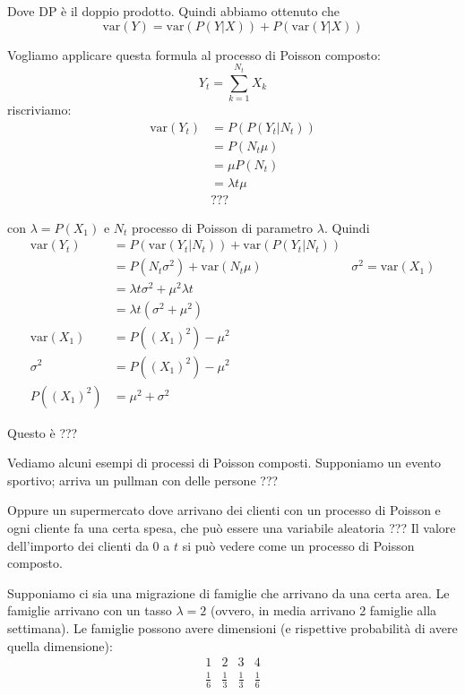 \documentclass[a4paper,12pt]{book}
\begin{document}
Dove DP è il doppio prodotto. Quindi abbiamo ottenuto che 
$$ \text{var}(Y) = \text{var}(P(Y|X)) + P(\text{var}(Y|X)) $$

Vogliamo applicare questa formula al processo di Poisson composto:
$$ Y_t = \sum_{k = 1}^{N_t} X_k $$ 
riscriviamo:
\begin{align*}
	\text{var}(Y_t) & = P(P(Y_t | N_t)) \\
	& = P(N_t \mu) \\
	& = \mu P(N_t) \\
	& = \lambda t \mu\\
	& ??? %
\end{align*}

con $\lambda = P(X_1)$ e $ N_t $ processo di Poisson di parametro $\lambda$.
Quindi 
\begin{align*}
	\text{var}(Y_t) & = P(\text{var}(Y_t | N_t)) + \text{var}(P(Y_t | N_t)) \\
	& = P(N_t \sigma^2) + \text{var}(N_t \mu) & \sigma^2 = \text{var}(X_1) \\
	& = \lambda t \sigma^2 + \mu^2 \lambda t \\ %
	& = \lambda t(\sigma^2 + \mu^2) \\
	\text{var}(X_1)	 & = P((X_1)^2) - \mu^2 \\
	\sigma^2 & = P((X_1)^2) - \mu^2 \\
	P((X_1)^2) & = \mu^2 + \sigma^2
\end{align*}

Questo è ??? %

Vediamo alcuni esempi di processi di Poisson composti. Supponiamo un evento sportivo; arriva un pullman con delle persone ??? %

Oppure un supermercato dove arrivano dei clienti con un processo di Poisson e ogni cliente fa una certa spesa, che può essere una variabile aleatoria ??? %
Il valore dell'importo dei clienti da 0 a $ t $ si può vedere come un processo di Poisson composto. 

Supponiamo ci sia una migrazione di famiglie che arrivano da una certa area. Le famiglie arrivano con un tasso $\lambda = 2$ (ovvero, in media arrivano 2 famiglie alla settimana).
Le famiglie possono avere dimensioni (e rispettive probabilità di avere quella dimensione):
$$ 
\begin{array}{cccc}
	1 & 2 & 3 & 4 \\
	\frac{1}{6} & \frac{1}{3} & \frac{1}{3} & \frac{1}{6}
\end{array}
$$
\end{document}

